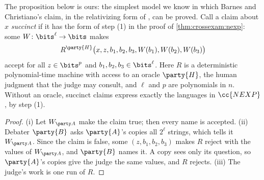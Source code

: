 \begin{refsection}
The proposition below is ours: the simplest model we know in which Barnes and Christiano's claim, in the relativizing form of \textcite{IrvingMarshall2025}, can be proved. Call a claim about $x$ \emph{succinct} if it has the form of step (1) in the proof of \cref{thm:crossexam:nexp}: some $W\colon\bits^\ell\to\bits$ makes
\[
  R^{\party{H}}\bigl(x,z,b_1,b_2,b_3,W(b_1),W(b_2),W(b_3)\bigr)
\]
accept for all $z\in\bits^p$ and $b_1,b_2,b_3\in\bits^\ell$. Here $R$ is a deterministic polynomial-time machine with access to an oracle $\party{H}$, the human judgment that the judge may consult, and $\ell$ and $p$ are polynomials in $n$. Without an oracle, succinct claims express exactly the languages in $\cc{NEXP}$, by step (1).


\begin{proof}
(i) Let $W_{\party A}$ make the claim true; then every name is accepted. (ii) Debater $\party{B}$ asks $\party{A}$'s copies all $2^\ell$ strings, which tells it $W_{\party A}$. Since the claim is false, some $(z,b_1,b_2,b_3)$ makes $R$ reject with the values of $W_{\party A}$, and $\party{B}$ names it. A copy sees only its question, so $\party{A}$'s copies give the judge the same values, and $R$ rejects. (iii) The judge's work is one run of $R$.
\end{proof}


\end{refsection}
